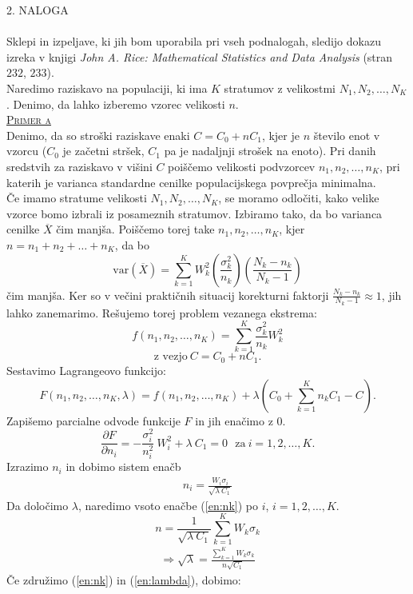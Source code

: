 \documentclass[a4paper,12pt]{article}
\begin{document}

\noindent
\textsc{\large{2. NALOGA}}
\\
\\
Sklepi in izpeljave, ki jih bom uporabila pri vseh podnalogah, sledijo dokazu izreka v knjigi \textit{John A. Rice: Mathematical Statistics and Data Analysis} (stran $232$, $233$).
\\
Naredimo raziskavo na populaciji, ki ima $K$ stratumov z velikostmi $N_1, N_2, \ldots, N_K$. Denimo, da lahko izberemo vzorec velikosti $n$.
\\

\noindent
\textsc{\underline{Primer a}}
\\
Denimo, da so stroški raziskave enaki $C = C_0 + n C_1$, kjer je $n$ število enot v vzorcu ($C_0$ je začetni stršek, $C_1$ pa je nadaljnji strošek na enoto). Pri danih sredstvih za raziskavo v višini $C$ poiščemo velikosti podvzorcev $n_1, n_2, \ldots, n_K$, pri katerih je varianca standardne cenilke populacijskega povprečja minimalna.
\\
Če imamo stratume velikosti $N_1, N_2, \ldots, N_K$, se moramo odločiti, kako velike vzorce bomo izbrali iz posameznih stratumov. Izbiramo tako, da bo varianca cenilke $\overline{X}$ čim manjša. 
Poiščemo torej take $n_1, n_2, \ldots, n_K$, kjer $n = n_1 + n_2 + \ldots + n_K$, da bo $$ \text{var}(\overline{X}) = \sum_{k = 1}^{K} W_k ^ 2 \left( \frac{ \sigma_k^2}{n_k} \right) \left( \frac{N_k - n_k}{N_k - 1} \right) $$
čim manjša.
Ker so v večini praktičnih situacij korekturni faktorji $\frac{N_k - n_k}{N_k - 1} \approx 1$, jih lahko zanemarimo. Rešujemo torej problem vezanega ekstrema:
$$ f(n_1, n_2, \ldots, n_K) = \sum_{k = 1}^{K} \frac{\sigma_k^2}{n_k} W_k^2 $$
$$ \text{z vezjo} \  C = C_0 + nC_1.$$
Sestavimo Lagrangeovo funkcijo:
$$ F(n_1, n_2, \ldots, n_K, \lambda) = f(n_1, n_2, \ldots, n_K) + \lambda (C_0 + \sum_{k = 1}^{K} n_k C_1 - C). $$
Zapišemo parcialne odvode funkcije $F$ in jih enačimo z $0$.
$$ \frac{ \partial F}{\partial n_i} = - \frac{ \sigma_i^2}{n_i^2} \  W_i^2 + \lambda \ C_1 = 0 \ \ \ \text{za} \ i = 1, 2, \ldots, K. $$
Izrazimo $n_i$ in dobimo sistem enačb
\begin{align}\label{en:nk}
n_i = \frac{W_i \sigma_i}{ \sqrt{ \lambda \ C_1}}
\end{align}
Da določimo $\lambda$, naredimo vsoto enačbe (\ref{en:nk}) po $i$, $i = 1, 2, \ldots, K.$
$$ n = \frac{1}{\sqrt{\lambda \ C_1}} \sum_{k = 1}^{K} W_k \sigma_k $$
\begin{align}\label{en:lambda}
\Rightarrow \sqrt{\lambda} = \frac{\sum_{k = 1}^{K} W_k \sigma_k}{n \sqrt{C_1}}
\end{align}
Če združimo (\ref{en:nk}) in (\ref{en:lambda}), dobimo:
\end{document}
